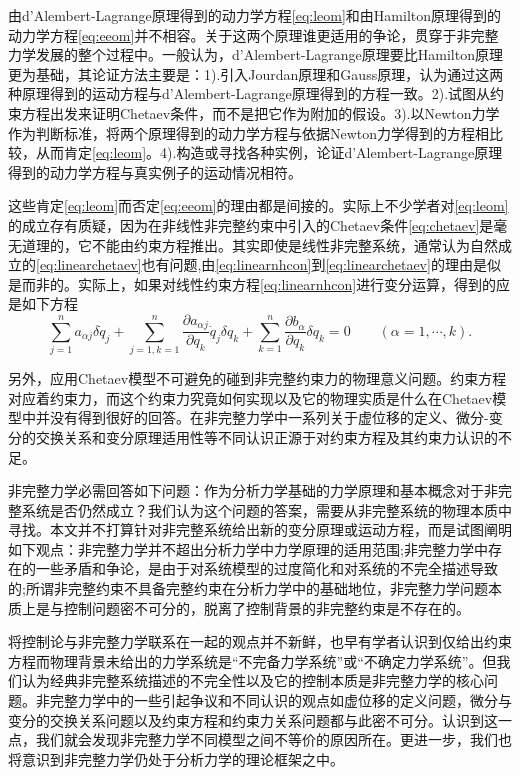 \documentclass[A4,twoside]{ctexart}
\begin{document}
由d'Alembert-Lagrange原理得到的动力学方程\eqref{eq:leom}和由Hamilton原理得到的动力学方程\eqref{eq:eeom}并不相容。关于这两个原理谁更适用的争论，贯穿于非完整力学发展的整个过程中。一般认为，d'Alembert-Lagrange原理要比Hamilton原理更为基础\supercite{3,4}，其论证方法主要是：1).引入Jourdan原理和Gauss原理，认为通过这两种原理得到的运动方程与d'Alembert-Lagrange原理得到的方程一致。2).试图从约束方程出发来证明Chetaev条件，而不是把它作为附加的假设。3).以Newton力学作为判断标准，将两个原理得到的动力学方程与依据Newton力学得到的方程相比较，从而肯定\eqref{eq:leom}。4).构造或寻找各种实例，论证d'Alembert-Lagrange原理得到的动力学方程与真实例子的运动情况相符。


这些肯定\eqref{eq:leom}而否定\eqref{eq:eeom}的理由都是间接的。实际上不少学者对\eqref{eq:leom}的成立存有质疑，因为在非线性非完整约束中引入的Chetaev条件\eqref{eq:chetaev}是毫无道理的，它不能由约束方程推出。其实即使是线性非完整系统，通常认为自然成立的\eqref{eq:linearchetaev}也有问题,由\eqref{eq:linearnhcon}到\eqref{eq:linearchetaev}的理由是似是而非的。实际上，如果对线性约束方程\eqref{eq:linearnhcon}进行变分运算，得到的应是如下方程
\begin{equation}
 \sum_{j = 1}^n a_{\alpha j}  \delta \dot{ q}_j +  \sum_{j = 1,k=1}^n \frac{\partial a_{\alpha j} }{\partial q_k} \dot{ q}_j \delta q_k +\sum_{k=1}^n \frac{\partial b_\alpha }{\partial q_k}\delta q_k = 0 \hspace{2em} ( \alpha = 1, \cdots, k).
\end{equation}

另外，应用Chetaev模型不可避免的碰到非完整约束力的物理意义问题。约束方程对应着约束力，而这个约束力究竟如何实现以及它的物理实质是什么在Chetaev模型中并没有得到很好的回答。在非完整力学中一系列关于虚位移的定义、微分-变分的交换关系和变分原理适用性等不同认识正源于对约束方程及其约束力认识的不足\supercite{8}。

非完整力学必需回答如下问题：作为分析力学基础的力学原理和基本概念对于非完整系统是否仍然成立？我们认为这个问题的答案，需要从非完整系统的物理本质中寻找。本文并不打算针对非完整系统给出新的变分原理或运动方程，而是试图阐明如下观点：非完整力学并不超出分析力学中力学原理的适用范围;非完整力学中存在的一些矛盾和争论，是由于对系统模型的过度简化和对系统的不完全描述导致的;所谓非完整约束不具备完整约束在分析力学中的基础地位，非完整力学问题本质上是与控制问题密不可分的，脱离了控制背景的非完整约束是不存在的。

将控制论与非完整力学联系在一起的观点并不新鲜\supercite{7}，也早有学者认识到仅给出约束方程而物理背景未给出的力学系统是“不完备力学系统”或“不确定力学系统”\supercite{8}。但我们认为经典非完整系统描述的不完全性以及它的控制本质是非完整力学的核心问题。非完整力学中的一些引起争议和不同认识的观点如虚位移的定义问题，微分与变分的交换关系问题以及约束方程和约束力关系问题都与此密不可分。认识到这一点，我们就会发现非完整力学不同模型之间不等价的原因所在。更进一步，我们也将意识到非完整力学仍处于分析力学的理论框架之中。
\end{document}
